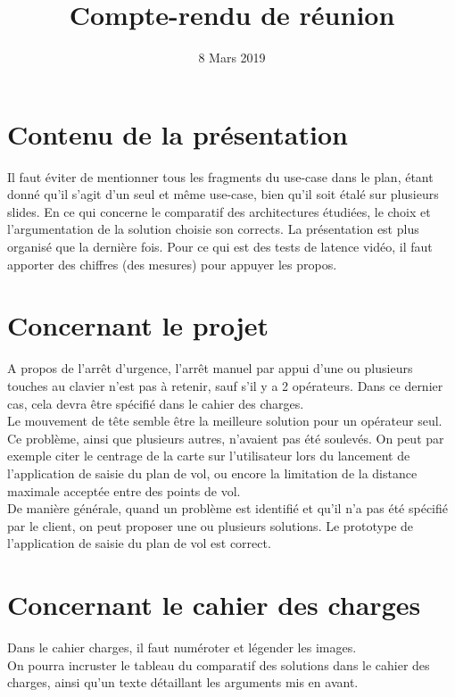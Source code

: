 \documentclass{article}
\title{Compte-rendu de réunion}
\date{8 Mars 2019}
\begin{document}
\maketitle

\section{Contenu de la présentation}
Il faut éviter de mentionner tous les fragments du use-case dans le plan, étant donné qu'il s'agit d'un seul et même use-case, bien qu'il soit étalé sur plusieurs slides.
\bigbreak
En ce qui concerne le comparatif des architectures étudiées, le choix et l'argumentation de la solution choisie son corrects.
La présentation est plus organisé que la dernière fois.
\bigbreak
Pour ce qui est des tests de latence vidéo, il faut apporter des chiffres (des mesures) pour appuyer les propos.
\bigbreak

\section{Concernant le projet}
\bigbreak
A propos de l'arrêt d'urgence, l'arrêt manuel par appui d'une ou plusieurs touches au clavier n'est pas à retenir, sauf s'il y a 2 opérateurs. Dans ce dernier cas, cela devra être spécifié dans le cahier des charges.\\
Le mouvement de tête semble être la meilleure solution pour un opérateur seul.\\
Ce problème, ainsi que plusieurs autres, n'avaient pas été soulevés. On peut par exemple citer le centrage de la carte sur l'utilisateur lors du lancement de l'application de saisie du plan de vol, ou encore la limitation de la distance maximale acceptée entre des points de vol.\\
De manière générale, quand un problème est identifié et qu'il n'a pas été spécifié par le client, on peut proposer une ou plusieurs solutions.
\bigbreak 
Le prototype de l'application de saisie du plan de vol est correct.
\bigbreak

\section{Concernant le cahier des charges}
Dans le cahier charges, il faut numéroter et légender les images.\\
On pourra incruster le tableau du comparatif des solutions dans le cahier des charges, ainsi qu'un texte détaillant les arguments mis en avant.\\
\end{document}
